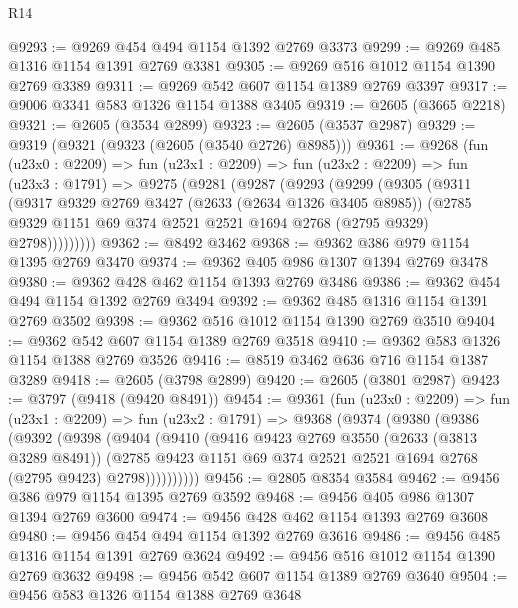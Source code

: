 \begin{lexlean}{R14}
\begin{coremodule}
@9293 := @9269 @454 @494 @1154 @1392 @2769 @3373
@9299 := @9269 @485 @1316 @1154 @1391 @2769 @3381
@9305 := @9269 @516 @1012 @1154 @1390 @2769 @3389
@9311 := @9269 @542 @607 @1154 @1389 @2769 @3397
@9317 := @9006 @3341 @583 @1326 @1154 @1388 @3405
@9319 := @2605 (@3665 @2218)
@9321 := @2605 (@3534 @2899)
@9323 := @2605 (@3537 @2987)
@9329 := @9319 (@9321 (@9323 (@2605 (@3540 @2726) @8985)))
@9361 := @9268
    (fun (u23x0 : @2209) =>
    fun (u23x1 : @2209) =>
    fun (u23x2 : @2209) =>
    fun (u23x3 : @1791) =>
    @9275
      (@9281
        (@9287
          (@9293
            (@9299
              (@9305
                (@9311
                  (@9317
                    @9329
                    @2769
                    @3427
                    (@2633 (@2634 @1326 @3405 @8985))
                    (@2785 @9329 @1151 @69 @374 @2521 @2521 @1694 @2768 (@2795 @9329) @2798)))))))))
@9362 := @8492 @3462
@9368 := @9362 @386 @979 @1154 @1395 @2769 @3470
@9374 := @9362 @405 @986 @1307 @1394 @2769 @3478
@9380 := @9362 @428 @462 @1154 @1393 @2769 @3486
@9386 := @9362 @454 @494 @1154 @1392 @2769 @3494
@9392 := @9362 @485 @1316 @1154 @1391 @2769 @3502
@9398 := @9362 @516 @1012 @1154 @1390 @2769 @3510
@9404 := @9362 @542 @607 @1154 @1389 @2769 @3518
@9410 := @9362 @583 @1326 @1154 @1388 @2769 @3526
@9416 := @8519 @3462 @636 @716 @1154 @1387 @3289
@9418 := @2605 (@3798 @2899)
@9420 := @2605 (@3801 @2987)
@9423 := @3797 (@9418 (@9420 @8491))
@9454 := @9361
    (fun (u23x0 : @2209) =>
    fun (u23x1 : @2209) =>
    fun (u23x2 : @1791) =>
    @9368
      (@9374
        (@9380
          (@9386
            (@9392
              (@9398
                (@9404
                  (@9410
                    (@9416
                      @9423
                      @2769
                      @3550
                      (@2633 (@3813 @3289 @8491))
                      (@2785
                        @9423
                        @1151
                        @69
                        @374
                        @2521
                        @2521
                        @1694
                        @2768
                        (@2795 @9423)
                        @2798))))))))))
@9456 := @2805 @8354 @3584
@9462 := @9456 @386 @979 @1154 @1395 @2769 @3592
@9468 := @9456 @405 @986 @1307 @1394 @2769 @3600
@9474 := @9456 @428 @462 @1154 @1393 @2769 @3608
@9480 := @9456 @454 @494 @1154 @1392 @2769 @3616
@9486 := @9456 @485 @1316 @1154 @1391 @2769 @3624
@9492 := @9456 @516 @1012 @1154 @1390 @2769 @3632
@9498 := @9456 @542 @607 @1154 @1389 @2769 @3640
@9504 := @9456 @583 @1326 @1154 @1388 @2769 @3648

\end{coremodule}
\end{lexlean}

